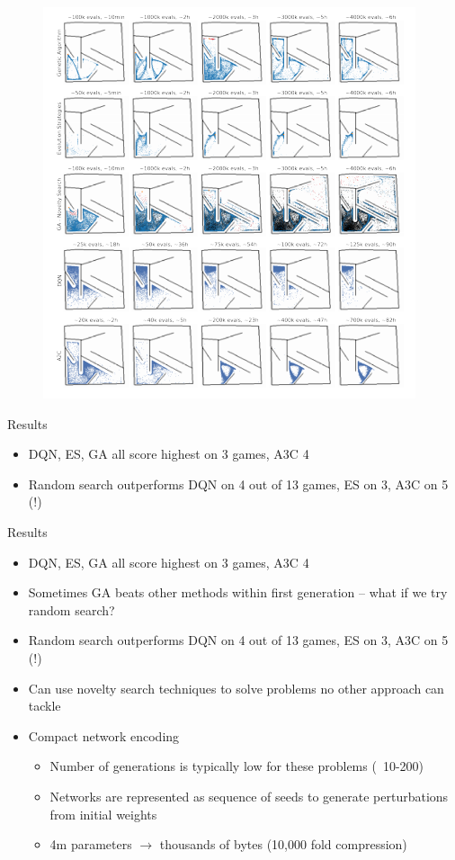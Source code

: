 \documentclass{beamer}
\begin{document}
	\begin{frame}
		\begin{figure}
			\centering
			\includegraphics[width=.9\textheight]{ga_novelty.png}
		\end{figure}
	\end{frame}
	
	\begin{frame}{Results}
		\begin{itemize}
			\item DQN, ES, GA all score highest on 3 games, A3C 4
			\item Random search outperforms DQN on 4 out of 13 games, ES on 3, A3C on 5 (!)
		\end{itemize}
	\end{frame}	
	
	\begin{frame}{Results}
		\begin{itemize}
			\item DQN, ES, GA all score highest on 3 games, A3C 4
			\item Sometimes GA beats other methods within first generation -- what if we try random search?
			\item Random search outperforms DQN on 4 out of 13 games, ES on 3, A3C on 5 (!)
			\item Can use novelty search techniques to solve problems no other approach can tackle
			\item Compact network encoding
			\begin{itemize}
				\item Number of generations is typically low for these problems (~10-200)
				\item Networks are represented as sequence of seeds to generate perturbations from initial weights
				\item 4m parameters $\rightarrow$ thousands of bytes (10,000 fold compression)
			\end{itemize}
		\end{itemize}
	\end{frame}
	
\end{document}
